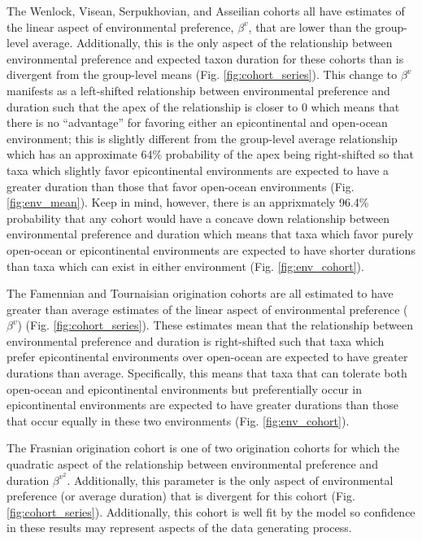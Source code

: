 \documentclass[11pt]{article}
\begin{document}
The Wenlock, Visean, Serpukhovian, and Asseilian cohorts all have estimates of the linear aspect of environmental preference, \(\beta^{v}\), that are lower than the group-level average. Additionally, this is the only aspect of the relationship between environmental preference and expected taxon duration for these cohorts than is divergent from the group-level means (Fig. \ref{fig:cohort_series}). This change to \(\beta^{v}\) manifests as a left-shifted relationship between environmental preference and duration such that the apex of the relationship is closer to 0 which means that there is no ``advantage'' for favoring either an epicontinental and open-ocean environment; this is slightly different from the group-level average relationship which has an approximate 64\% probability of the apex being right-shifted so that taxa which slightly favor epicontinental environments are expected to have a greater duration than those that favor open-ocean environments (Fig. \ref{fig:env_mean}). Keep in mind, however, there is an apprixmately 96.4\% probability that any cohort would have a concave down relationship between environmental preference and duration which means that taxa which favor purely open-ocean or epicontinental environments are expected to have shorter durations than taxa which can exist in either environment (Fig. \ref{fig:env_cohort}).

The Famennian and Tournaisian origination cohorts are all estimated to have greater than average estimates of the linear aspect of environmental preference (\(\beta^{v}\)) (Fig. \ref{fig:cohort_series}). These estimates mean that the relationship between environmental preference and duration is right-shifted such that taxa which prefer epicontinental environments over open-ocean are expected to have greater durations than average. Specifically, this means that taxa that can tolerate both open-ocean and epicontinental environments but preferentially occur in epicontinental environments are expected to have greater durations than those that occur equally in these two environments (Fig. \ref{fig:env_cohort}).

The Frasnian origination cohort is one of two origination cohorts for which the quadratic aspect of the relationship between environmental preference and duration \(\beta^{v^{2}}\). Additionally, this parameter is the only aspect of environmental preference (or average duration) that is divergent for this cohort (Fig. \ref{fig:cohort_series}). Additionally, this cohort is well fit by the model so confidence in these results may represent aspects of the data generating process.
\end{document}
